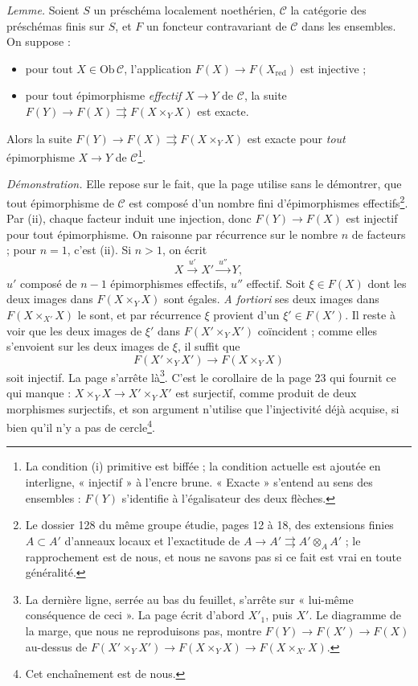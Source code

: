\documentclass[11pt,a4paper]{article}
\begin{document}
\emph{Lemme.} Soient $S$ un préschéma localement noethérien, $\mathcal{C}$ la
catégorie des préschémas finis sur $S$, et $F$ un foncteur contravariant de
$\mathcal{C}$ dans les ensembles. On suppose :
\begin{itemize}
  \item[(i)] pour tout $X \in \mathrm{Ob}\, \mathcal{C}$, l'application
  $F(X) \to F(X_{\mathrm{red}})$ est injective ;
  \item[(ii)] pour tout épimorphisme \emph{effectif} $X \to Y$ de
  $\mathcal{C}$, la suite $F(Y) \to F(X) \rightrightarrows F(X \times_Y X)$
  est exacte.
\end{itemize}
Alors la suite $F(Y) \to F(X) \rightrightarrows F(X \times_Y X)$ est exacte
pour \emph{tout} épimorphisme $X \to Y$ de $\mathcal{C}$\footnote{La condition
(i) primitive est biffée ; la condition actuelle est ajoutée en interligne,
« injectif » à l'encre brune. « Exacte » s'entend au sens des ensembles :
$F(Y)$ s'identifie à l'égalisateur des deux flèches.}.

\emph{Démonstration.} Elle repose sur le fait, que la page utilise sans le
démontrer, que tout épimorphisme de $\mathcal{C}$ est composé d'un nombre fini
d'épimorphismes effectifs\footnote{Le dossier 128 du même groupe étudie, pages
12 à 18, des extensions finies $A \subset A'$ d'anneaux locaux et l'exactitude
de $A \to A' \rightrightarrows A' \otimes_A A'$ ; le rapprochement est de nous,
et nous ne savons pas si ce fait est vrai en toute généralité.}. Par (ii),
chaque facteur induit une injection, donc $F(Y) \to F(X)$ est injectif pour
tout épimorphisme. On raisonne par récurrence sur le nombre $n$ de facteurs ;
pour $n = 1$, c'est (ii). Si $n > 1$, on écrit
\[
  X \xrightarrow{\ u'\ } X' \xrightarrow{\ u''\ } Y ,
\]
$u'$ composé de $n - 1$ épimorphismes effectifs, $u''$ effectif. Soit
$\xi \in F(X)$ dont les deux images dans $F(X \times_Y X)$ sont égales.
\emph{A fortiori} ses deux images dans $F(X \times_{X'} X)$ le sont, et par
récurrence $\xi$ provient d'un $\xi' \in F(X')$. Il reste à voir que les deux
images de $\xi'$ dans $F(X' \times_Y X')$ coïncident ; comme elles s'envoient
sur les deux images de $\xi$, il suffit que
\[
  F(X' \times_Y X') \to F(X \times_Y X)
\]
soit injectif. La page s'arrête là\footnote{La dernière ligne, serrée au bas du
feuillet, s'arrête sur « lui-même conséquence de ceci ». La page écrit
d'abord $X'_1$, puis $X'$. Le diagramme de la marge, que nous ne reproduisons
pas, montre $F(Y) \to F(X') \to F(X)$ au-dessus de
$F(X' \times_Y X') \to F(X \times_Y X) \to F(X \times_{X'} X)$.}. C'est le
corollaire de la page 23 qui fournit ce qui manque : $X \times_Y X \to X'
\times_Y X'$ est surjectif, comme produit de deux morphismes surjectifs, et
son argument n'utilise que l'injectivité déjà acquise, si bien qu'il n'y a pas
de cercle\footnote{Cet enchaînement est de nous.}.
\end{document}
